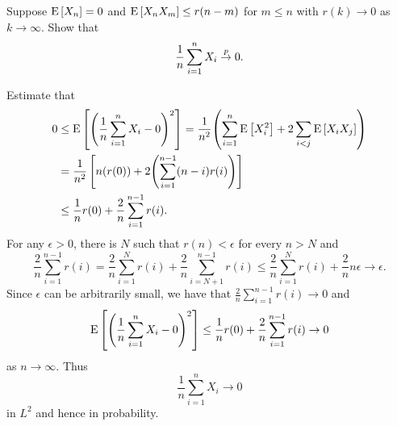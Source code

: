 \documentclass[a4paper, 12pt]{article}
\begin{document}
\begin{exercise}{2.7}
    Suppose $\operatorname{E}\left[ {X_n} \right] = 0$ and $\operatorname{E}\left[ {X_nX_m} \right]\leq r(n-m)$ for $m\leq n$ 
    with $r(k)\to 0$ as $k\to\infty$. Show that 
    \begin{equation*}
        \frac{1}{n}\sum_{i=1}^nX_i \overset{p}{\to} 0.
    \end{equation*}
\end{exercise}
\begin{solution}
    Estimate that
    \begin{equation*}
        \begin{split}
            0 &\leq \E\sbrc{\pth{\frac{1}{n}\sum_{i=1}^nX_i - 0}^2} 
            = \frac{1}{n^2}\pth{\sum_{i=1}^n\E\sbrc{X_i^2} + 2\sum_{i<j}\E\sbrc{X_iX_j}} \\
            &= \frac{1}{n^2}\sbrc{n(r(0)) + 2\pth{\sum_{i=1}^{n-1}(n-i)r(i)}} \\ 
            &\leq \frac{1}{n}r(0) + \frac{2}{n}\sum_{i=1}^{n-1}r(i).
        \end{split}
    \end{equation*}
    For any $\epsilon>0$, there is $N$ such that $r(n)<\epsilon$ for every $n>N$ and 
    \begin{equation*}
        \frac{2}{n}\sum_{i=1}^{n-1}r(i) = \frac{2}{n}\sum_{i=1}^Nr(i) + \frac{2}{n}\sum_{i=N+1}^{n-1}r(i) 
        \leq \frac{2}{n}\sum_{i=1}^Nr(i) + \frac{2}{n}n\epsilon \to \epsilon. 
    \end{equation*}
    Since $\epsilon$ can be arbitrarily small, we have that $\frac{2}{n}\sum_{i=1}^{n-1}r(i)\to 0$ and 
    \begin{equation*}
        \E\sbrc{\pth{\frac{1}{n}\sum_{i=1}^nX_i - 0}^2} 
        \leq \frac{1}{n}r(0) + \frac{2}{n}\sum_{i=1}^{n-1}r(i) \to 0
    \end{equation*}
    as $n\to\infty$. Thus 
    \begin{equation*}
        \frac{1}{n}\sum_{i=1}^nX_i \to 0
    \end{equation*}
    in $L^2$ and hence in probability. 
\end{solution}
\end{document}
